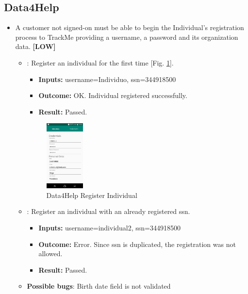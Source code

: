 \documentclass[a4paper, hidelinks, 12pt]{report}
\newcommand\requirement[1]{\item[{[REQ-#1]}] }
\newcommand\test[1]{\item[{[TEST-#1]}] }
\begin{document}
	\subsection{Data4Help}
	\begin{itemize}
		\requirement{1} A customer not signed-on must be able to begin the Individual’s registration process to TrackMe providing a username, a password and its organization data.  \textbf{[LOW]}
		
	\begin{itemize}
		\test{1}: Register an individual for the first time [Fig. \ref{fig:register_individual}].
			\begin{itemize}
			\item \textbf{Inputs: } username=Individuo, ssn=344918500			
			\item \textbf{Outcome: } OK. Individual registered successfully. 
			\item \textbf{Result: } Passed. 
			\end{itemize}
			
		\begin{figure}[H]
					\centering
				\includegraphics[width=0.2\textwidth]{images/register_individual.jpeg}
					\caption[Data4Help Register Individual]{Data4Help Register Individual}
				\label{fig:register_individual}
			\end{figure}
			
		\test{2}: Register an individual with an already registered ssn.
			\begin{itemize}
			\item \textbf{Inputs: } username=individual2, ssn=344918500
			\item \textbf{Outcome: } Error. Since ssn is duplicated, the registration was not allowed.
			\item \textbf{Result: } Passed. 
			 \end{itemize}	
			 
		\item \textbf{Possible bugs}: Birth date field is not validated
	\end{itemize}
	

\end{itemize}
\end{document}
